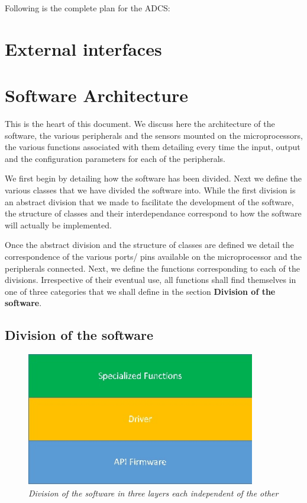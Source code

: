 \documentclass[11pt,a4paper]{report}
\begin{document}
Following is the complete plan for the ADCS: 



\chapter{External interfaces} \thispagestyle{fancy}



\chapter{Software Architecture} \thispagestyle{fancy}
This is the heart of this document. We discuss here the architecture of the software, the various peripherals and the sensors mounted on the microprocessors, the various functions associated with them detailing every time the input, output and the configuration parameters for each of the peripherals. 

We first begin by detailing how the software has been divided. Next we define the various classes that we have divided the software into. While the first division is an abstract division that we made to facilitate the development of the software, the structure of classes and their interdependance correspond to how the software will actually be implemented. 

Once the abstract division and the structure of classes are defined we detail the correspondence of the various ports/ pins available on the microprocessor and the peripherals connected. Next, we define the functions corresponding to each of the divisions. Irrespective of their eventual use, all functions shall find themselves in one of three categories that we shall define in the section \textbf{Division of the software}. 


\section{Division of the software} 

\begin{figure}[!h]
\centering 
\includegraphics[width=10cm]{arch_layers.jpg}
\caption{\textit{Division of the software in three layers each independent of the other}}
\label{layers_arch_soft}
\end{figure}
 
\end{document}
